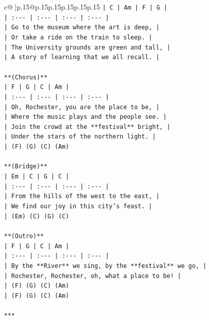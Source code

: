 \documentclass{article}
\begin{document}
{\begin{supertabular}{c@{$\;$}|p{.15\linewidth}@{}p{.15\linewidth}p{.15\linewidth}p{.15\linewidth}p{.15\linewidth}p{.15\linewidth}}
{{{\texttt{| C | Am | F | G |} \\
\texttt{| :{-}{-}{-} | :{-}{-}{-} | :{-}{-}{-} | :{-}{-}{-} |} \\
\texttt{| Go to the museum where the art is deep, |} \\
\texttt{| Or take a ride on the train to sleep. |} \\
\texttt{| The University grounds are green and tall, |} \\
\texttt{| A story of learning that we all recall. |} \\
\\ 
\texttt{**(Chorus)**} \\
\texttt{| F | G | C | Am |} \\
\texttt{| :{-}{-}{-} | :{-}{-}{-} | :{-}{-}{-} | :{-}{-}{-} |} \\
\texttt{| Oh, Rochester, you are the place to be, |} \\
\texttt{| Where the music plays and the people see. |} \\
\texttt{| Join the crowd at the **festival** bright, |} \\
\texttt{| Under the stars of the northern light. |} \\
\texttt{| (F) (G) (C) (Am)} \\
\\ 
\texttt{**(Bridge)**} \\
\texttt{| Em | C | G | C |} \\
\texttt{| :{-}{-}{-} | :{-}{-}{-} | :{-}{-}{-} | :{-}{-}{-} |} \\
\texttt{| From the hills of the west to the east, |} \\
\texttt{| We find our joy in this city's feast. |} \\
\texttt{| (Em) (C) (G) (C)} \\
\\ 
\texttt{**(Outro)**} \\
\texttt{| F | G | C | Am |} \\
\texttt{| :{-}{-}{-} | :{-}{-}{-} | :{-}{-}{-} | :{-}{-}{-} |} \\
\texttt{| By the **River** we sing, by the **festival** we go, |} \\
\texttt{| Rochester, Rochester, oh, what a place to be! |} \\
\texttt{| (F) (G) (C) (Am)} \\
\texttt{| (F) (G) (C) (Am)} \\
\\ 
\texttt{***} \\
\\ 
}}}
\end{supertabular}}
\end{document}
